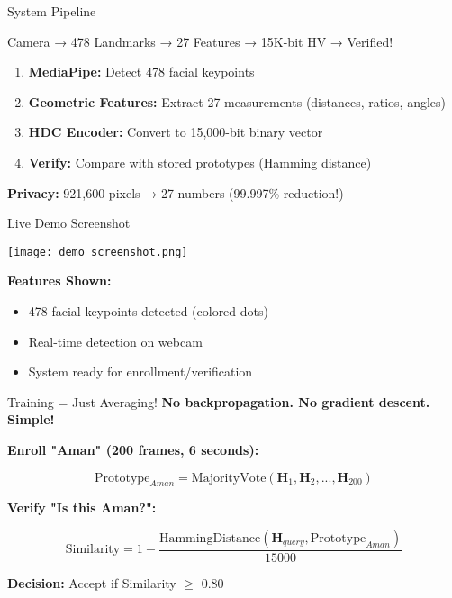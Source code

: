 \documentclass[aspectratio=169]{beamer}
\begin{document}
\begin{frame}{System Pipeline}
\begin{center}
\Large
Camera → 478 Landmarks → 27 Features → 15K-bit HV → Verified!
\end{center}

\vspace{1em}

\begin{enumerate}
    \item \textbf{MediaPipe:} Detect 478 facial keypoints
    \item \textbf{Geometric Features:} Extract 27 measurements (distances, ratios, angles)
    \item \textbf{HDC Encoder:} Convert to 15,000-bit binary vector
    \item \textbf{Verify:} Compare with stored prototypes (Hamming distance)
\end{enumerate}

\vspace{1em}
\textbf{Privacy:} 921,600 pixels → 27 numbers (99.997\% reduction!)
\end{frame}

\begin{frame}{Live Demo Screenshot}
\begin{center}
\texttt{[image: demo\_screenshot.png]}
\end{center}

\textbf{Features Shown:}
\begin{itemize}
    \item 478 facial keypoints detected (colored dots)
    \item Real-time detection on webcam
    \item System ready for enrollment/verification
\end{itemize}
\end{frame}

\begin{frame}{Training = Just Averaging!}
\textbf{No backpropagation. No gradient descent. Simple!}

\textbf{Enroll "Aman" (200 frames, 6 seconds):}

\begin{equation*}
\text{Prototype}_{Aman} = \text{MajorityVote}(\mathbf{H}_1, \mathbf{H}_2, ..., \mathbf{H}_{200})
\end{equation*}

\textbf{Verify "Is this Aman?":}

\begin{equation*}
\text{Similarity} = 1 - \frac{\text{HammingDistance}(\mathbf{H}_{query}, \text{Prototype}_{Aman})}{15000}
\end{equation*}

\textbf{Decision:} Accept if Similarity $\geq$ 0.80

\vspace{0.5em}
\end{frame}
\end{document}
